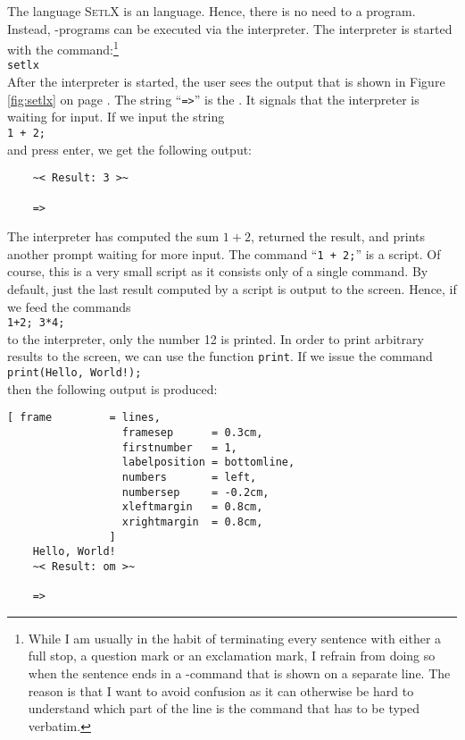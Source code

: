 The language \textsc{SetlX} is an  language.  Hence, there is no need to  a
program.  Instead, \setl-programs can be executed via the interpreter.  The interpreter is started
with the command:\footnote{
  While I am usually in the habit of terminating every sentence with either a full stop, a question
  mark or an exclamation mark, I refrain from doing so when the sentence ends in a \setl-command
  that is shown on a separate line.  The reason is that I want to avoid confusion as it can
  otherwise be hard to understand which part of the line is the command that has to be typed
  verbatim.
}
\\[0.2cm]
\hspace*{1.3cm}
\texttt{setlx}
\\[0.2cm]
After the interpreter is started, the user sees the output that is shown in Figure 
\ref{fig:setlx} on page \pageref{fig:setlx}.  The string
``\texttt{=>}'' is the .  It signals that the interpreter is waiting for input.
If we input the string
\\[0.2cm]
\hspace*{1.3cm}
\texttt{1 + 2;}
\\[0.2cm]
and press enter, we get the following output:
\begin{verbatim}
    ~< Result: 3 >~
    
    => 
\end{verbatim}
The interpreter has computed the sum $1+2$, returned the result, and prints another prompt waiting
for more input.  The command ``\texttt{1 + 2;}''
is a script.  Of course, this is a very small script as it consists only of a single command.
By default, just the last result computed by a script is output to the screen.  Hence, if we feed
the commands
\\[0.2cm]
\hspace*{1.3cm}
\texttt{1+2; 3*4;}
\\[0.2cm]
to the interpreter, only the number 12 is printed.  In order to print arbitrary results to
the screen, we can use the function \texttt{print}.  If we issue the command
\\[0.2cm]
\hspace*{1.3cm}
\texttt{print(Hello, World!);}
\\[0.2cm]
then the following output is produced:
\begin{Verbatim}[ frame         = lines, 
                  framesep      = 0.3cm, 
                  firstnumber   = 1,
                  labelposition = bottomline,
                  numbers       = left,
                  numbersep     = -0.2cm,
                  xleftmargin   = 0.8cm,
                  xrightmargin  = 0.8cm,
                ]
    Hello, World!
    ~< Result: om >~
    
    => 
\end{Verbatim}

